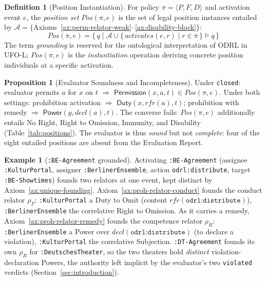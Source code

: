 \documentclass{IOS-Book-Article}
\newcommand{\activates}{\mathit{activates}}
\newcommand{\PermPos}{\mathsf{Permission}}   %
\newcommand{\Duty}{\mathsf{Duty}}            %
\newcommand{\Power}{\mathsf{Power}}          %
\newcommand{\odrl}[1]{\texttt{odrl:#1}}
\theoremstyle{definition}
\newtheorem{definition}{Definition}[section]
\newtheorem{proposition}{Proposition}[section]
\newtheorem{example}{Example}[section]
\begin{document}
\begin{definition}[Position Instantiation]
\label{def:ground}
For policy $\pi=\langle P,F,D\rangle$ and activation event $e$, the
\emph{position set} $\mathit{Pos}(\pi,e)$ is the set of legal position
instances entailed by $\mathcal{A}=\{$Axioms~\ref{ax:perm-relator-weak}--\ref{ax:disability-block}$\}$:
\[
  \mathit{Pos}(\pi,e) =
  \{\,q \mid \mathcal{A}\cup
  \{\,\activates(e,r)\mid r\in\pi\,\}
  \models q\,\}
\]
The term \emph{grounding} is reserved for the ontological interpretation
of ODRL in UFO-L; $\mathit{Pos}(\pi,e)$ is the \emph{instantiation}
operation deriving concrete position individuals at a specific activation.
\end{definition}
\begin{proposition}[Evaluator Soundness and Incompleteness]
\label{prop:faithfulness}
Under \texttt{closed}: evaluator permits $a$ for $x$ on $t$
$\Rightarrow$ $\PermPos(x,a,t)\in\mathit{Pos}(\pi,e)$.
Under both settings: prohibition activation $\Rightarrow$
$\Duty(x,\mathit{rfr}(a),t)$; prohibition with remedy $\Rightarrow$
$\Power(y,\mathit{decl}(a),t)$.
The converse fails: $\mathit{Pos}(\pi,e)$ additionally entails No Right,
Right to Omission, Immunity, and Disability (Table~\ref{tab:positions}).
The evaluator is thus \emph{sound} but not \emph{complete}:
four of the eight entailed positions are absent from the
Evaluation Report.
\end{proposition}
\begin{example}[\texttt{:BE-Agreement} grounded]
\label{ex:pol1-relators}
Activating \texttt{:BE-Agreement} (assignee \texttt{:KulturPortal}, assigner
\texttt{:BerlinerEnsemble}, action \odrl{distribute}, target
\texttt{:BE-Showtimes}) founds two relators at one event, kept distinct by
Axiom~\ref{ax:unique-founding}. Axiom~\ref{ax:proh-relator-conduct} founds the
conduct relator $\rho_F$: \texttt{:KulturPortal} a Duty to Omit (content
$\mathit{rfr}(\odrl{distribute})$), \texttt{:BerlinerEnsemble} the correlative
Right to Omission. As it carries a remedy, Axiom~\ref{ax:proh-relator-remedy}
founds the competence relator $\rho_R$: \texttt{:BerlinerEnsemble} a Power over
$\mathit{decl}(\odrl{distribute})$ (to declare a violation),
\texttt{:KulturPortal} the correlative Subjection. \texttt{:DT-Agreement} founds
its own $\rho_R$ for \texttt{:DeutschesTheater}, so the two theaters hold
\emph{distinct} violation-declaration Powers, the authority left implicit by the
evaluator's two \texttt{violated} verdicts (Section~\ref{sec:introduction}).
\end{example}
\end{document}
